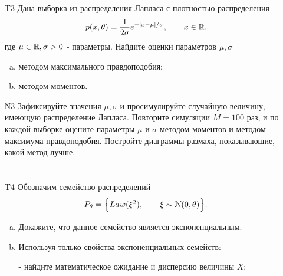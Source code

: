 \documentclass[12pt]{article}
\begin{document}
\begin{enumerate}
\section{}
\begin{enumerate}
\item[T3]
Дана выборка  из распределения Лапласа с плотностью распределения 
\begin{eqnarray*}
p(x, \theta)  = \frac{1}{2 \sigma} e^{-|x-\mu|/\sigma}, \qquad x \in {\mathbb{R}}.\end{eqnarray*}
где \(\mu \in {\mathbb{R}}, \sigma>0\) - параметры. Найдите оценки параметров \(\mu, \sigma\) 
\begin{enumerate}[(a)]
\item методом максимального правдоподобия; 
 \item методом моментов.
\end{enumerate}
\item[N3] Зафиксируйте значения \(\mu, \sigma\)  и просимулируйте случайную величину, имеющую распределение Лапласа. Повторите симуляции \(M=100\) раз, и по каждой выборке оцените параметры \(\mu\) и \(\sigma\) методом моментов и методом максимума правдоподобия. Постройте диаграммы размаха, показывающие, какой метод лучше.
\end{enumerate}
\section{}
\begin{enumerate}
\item[T4] Обозначим семейство распределений 
\begin{eqnarray*}
P_\theta= \Bigl\{ Law(\xi^2), \qquad
\xi \sim \EuScript{N}(0,\theta) \Bigr\}.
\end{eqnarray*}
\begin{enumerate}[(a)]
\item Докажите, что данное семейство является экспоненциальным. 
 \item Используя только свойства экспоненциальных семейств:
 
- найдите математическое ожидание и дисперсию величины \(X\);


\end{enumerate}
\end{enumerate}
\end{enumerate}
\end{document}
